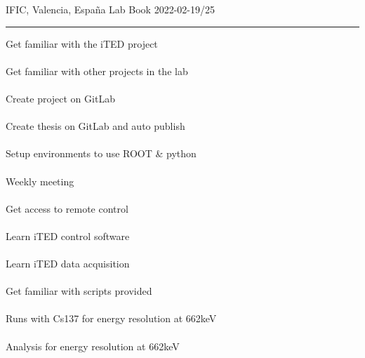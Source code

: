 \begin{center}
  {\Large IFIC, Valencia, España} \hfill {\Large Lab Book} \hfill {\Large 2022-02-19/25}\\
  \rule{\textwidth}{1pt}
\end{center}

\begin{minipage}[t][0.45\textheight][t]{0.97\linewidth}
  \begin{minipage}[t]{0.49\textwidth}
    \hspace{10pt}Get familiar with the iTED project\\~\\
    \hspace{10pt}Get familiar with other projects in the lab\\~\\
    \hspace{10pt}Create project on GitLab\\~\\
    \hspace{10pt}Create thesis on GitLab and auto publish\\~\\
    \hspace{10pt}Setup environments to use ROOT \& python\\~\\
    \hspace{10pt}Weekly meeting\\~\\
    \hspace{10pt}Get access to remote control\\~\\
    \hspace{10pt}Learn iTED control software\\~\\
    \hspace{10pt}Learn iTED data acquisition\\~\\
    \hspace{10pt}Get familiar with scripts provided\\~\\
    \hspace{10pt}Runs with Cs137 for energy resolution at 662keV\\~\\
    \hspace{10pt}Analysis for energy resolution at 662keV\\~\\

\end{minipage}
\end{minipage}
